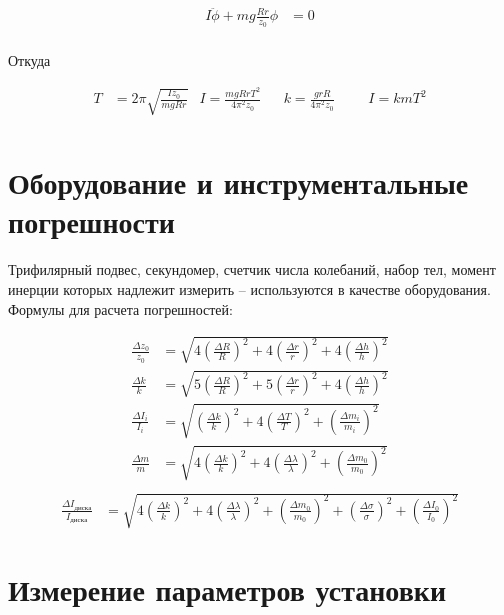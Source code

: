 \documentclass{article}
\begin{document}
\begin{align*}
   I \ddot {\phi} + mg\frac{Rr}{z_0}\phi&=0\\
\end{align*}

Откуда

\begin{align*}
   T&=2\pi\sqrt{\frac{Iz_0}{mgRr}} & I = \frac{mgRrT^2}{4\pi^2z_0} && k = \frac{grR}{4\pi^2z_0} &&& I=kmT^2\\
\end{align*}

\section{Оборудование и инструментальные погрешности}
Трифилярный подвес, секундомер, счетчик числа колебаний, набор тел, момент инерции которых надлежит измерить -- используются в качестве оборудования.
Формулы для расчета погрешностей:

\begin{align*}
  \frac{\Delta z_0}{z_0} &= \sqrt{4(\frac{\Delta R}{R})^2+4(\frac{\Delta r}{r})^2+4(\frac{\Delta h}{h})^2} \\
   \frac{\Delta k}{k} &= \sqrt{5(\frac{\Delta R}{R})^2+5(\frac{\Delta r}{r})^2+4(\frac{\Delta h}{h})^2}\\
   \frac{\Delta I_i}{I_i} &= \sqrt{(\frac{\Delta k}{k})^2+4(\frac{\Delta T}{T})^2+(\frac{\Delta m_i}{m_i})^2}\\
   \frac{\Delta m}{m} &= \sqrt{4(\frac{\Delta k}{k})^2+4(\frac{\Delta \lambda}{\lambda})^2+(\frac{\Delta m_0}{m_0})^2}\\
\end{align*}
\begin{align*}
   \frac{\Delta I_{диска}}{I_{диска}} &= \sqrt{4(\frac{\Delta k}{k})^2+4(\frac{\Delta \lambda}{\lambda})^2+(\frac{\Delta m_0}{m_0})^2+(\frac{\Delta \sigma}{\sigma})^2+(\frac{\Delta I_0}{I_0})^2}
\end{align*}

\section{Измерение параметров установки}
\end{document}
